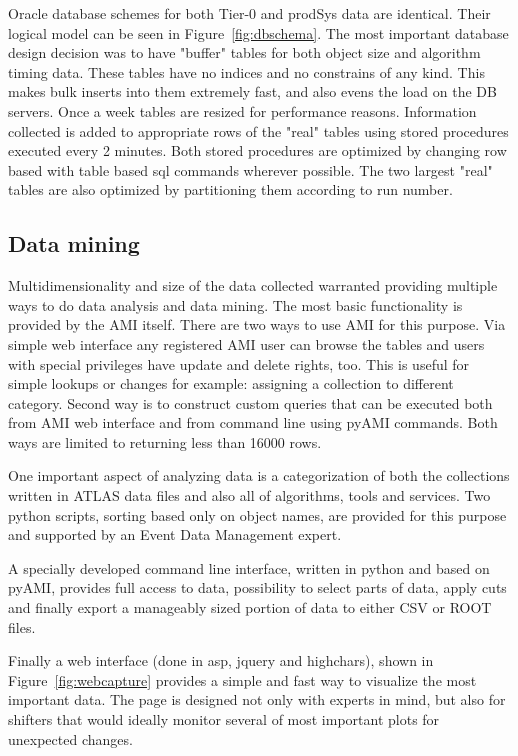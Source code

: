 \documentclass[a4paper]{jpconf}
\begin{document}
Oracle database schemes for both Tier-0 and prodSys data are identical. Their logical model can be seen in Figure~\ref{fig:dbschema}. The most important database design decision was to have "buffer" tables for both object size and algorithm timing data. These tables have no indices and no constrains of any kind. This makes bulk inserts into them extremely fast, and also evens the load on the DB servers. Once a week tables are resized for performance reasons. Information collected is added to appropriate rows of the "real" tables using stored procedures executed every 2 minutes. Both stored procedures are optimized by changing row based with table based sql commands wherever possible. The two largest "real" tables are also optimized by partitioning them according to run number.
 

	
\subsection{Data mining}

Multidimensionality and size of the data collected warranted providing multiple ways to do data analysis and data mining. The most basic functionality is provided by the AMI itself. There are two ways to use AMI for this purpose. Via simple web interface any registered AMI user can browse the tables and users with special privileges have update and delete rights, too. This is useful for simple lookups or changes for example: assigning a collection to different category. Second way is to construct custom queries that can be executed both from AMI web interface and from command line using pyAMI commands. Both ways are limited to returning less than 16000 rows.

One important aspect of analyzing data is a categorization of both the collections written in ATLAS data files and also all of algorithms, tools and services. Two python scripts, sorting based only on object names, are provided for this purpose and supported by an Event Data Management expert.  

A specially developed command line interface, written in python and based on pyAMI, provides full access to data, possibility to select parts of data, apply cuts and finally export a manageably sized portion of data to either CSV or ROOT files.
   
Finally a web interface (done in asp, jquery and highchars), shown in Figure~\ref{fig:webcapture} provides a simple and fast way to visualize the most important data. The page is designed not only with experts in mind, but also for shifters that would ideally monitor several of most important plots for unexpected changes.  
\end{document}
